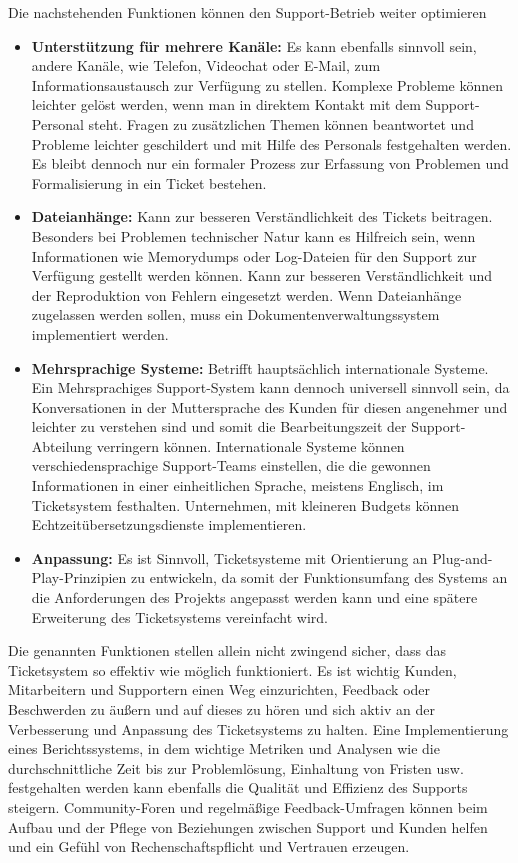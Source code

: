 \newpage
Die nachstehenden Funktionen können den Support-Betrieb weiter optimieren
\begin{itemize}
	\item \textbf{Unterstützung für mehrere Kanäle:} Es kann ebenfalls sinnvoll sein, andere Kanäle, wie Telefon, Videochat oder E-Mail, zum Informationsaustausch zur Verfügung zu stellen. Komplexe Probleme können leichter gelöst werden, wenn man in direktem Kontakt mit dem Support-Personal steht. Fragen zu zusätzlichen Themen können beantwortet und Probleme leichter geschildert und mit Hilfe des Personals festgehalten werden. Es bleibt dennoch nur ein formaler Prozess zur Erfassung von Problemen und Formalisierung in ein Ticket bestehen.
	\item \textbf{Dateianhänge:} Kann zur besseren Verständlichkeit des Tickets beitragen. Besonders bei Problemen technischer Natur kann es Hilfreich sein, wenn Informationen wie Memorydumps oder Log-Dateien für den Support zur Verfügung gestellt werden können. Kann zur besseren Verständlichkeit und der Reproduktion von Fehlern eingesetzt werden. Wenn Dateianhänge zugelassen werden sollen, muss ein Dokumentenverwaltungssystem implementiert werden.
	\item \textbf{Mehrsprachige Systeme:} Betrifft hauptsächlich internationale Systeme. Ein Mehrsprachiges Support-System kann dennoch universell sinnvoll sein, da Konversationen in der Muttersprache des Kunden für diesen angenehmer und leichter zu verstehen sind und somit die Bearbeitungszeit der Support-Abteilung verringern können. Internationale Systeme können verschiedensprachige Support-Teams einstellen, die die gewonnen Informationen in einer einheitlichen Sprache, meistens Englisch, im Ticketsystem festhalten. Unternehmen, mit kleineren Budgets können Echtzeitübersetzungsdienste implementieren.
	\item \textbf{Anpassung:} Es ist Sinnvoll, Ticketsysteme mit Orientierung an Plug-and-Play-Prinzipien zu entwickeln, da somit der Funktionsumfang des Systems an die Anforderungen des Projekts angepasst werden kann und eine spätere Erweiterung des Ticketsystems vereinfacht wird.
\end{itemize}  
Die genannten Funktionen stellen allein nicht zwingend sicher, dass das Ticketsystem so effektiv wie möglich funktioniert. Es ist wichtig Kunden, Mitarbeitern und Supportern einen Weg einzurichten, Feedback oder Beschwerden zu äußern und auf dieses zu hören und sich aktiv an der Verbesserung und Anpassung des Ticketsystems zu halten. 
Eine Implementierung eines Berichtssystems, in dem wichtige Metriken und Analysen wie die durchschnittliche Zeit bis zur Problemlösung, Einhaltung von Fristen usw. festgehalten werden kann ebenfalls die Qualität und Effizienz des Supports steigern. 
Community-Foren und regelmäßige Feedback-Umfragen können beim Aufbau und der Pflege von Beziehungen zwischen Support und Kunden helfen und ein Gefühl von Rechenschaftspflicht und Vertrauen erzeugen.
\newpage
